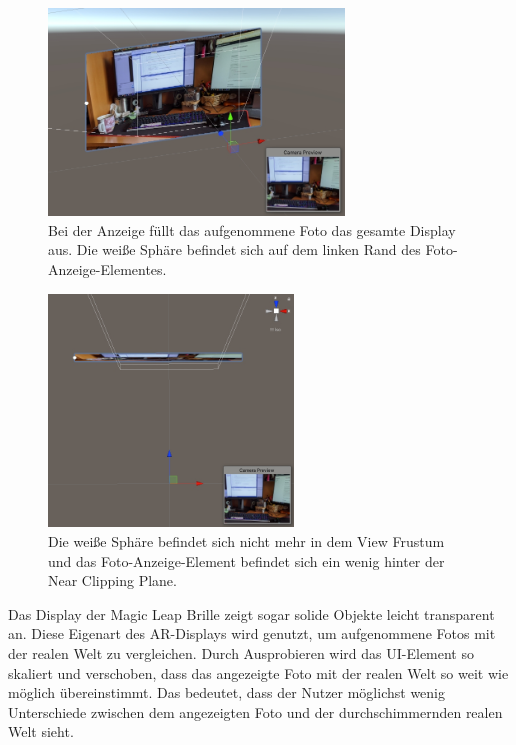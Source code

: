 \begin{figure}[H]
	\centering
	\includegraphics[width=0.7\textwidth]{images/canvasinyourface2.jpg}
	\caption[Ränder des Foto-Anzeige-Elements finden]{Bei der Anzeige füllt das aufgenommene Foto das gesamte Display aus. Die weiße Sphäre befindet sich auf dem linken Rand des Foto-Anzeige-Elementes.}
	\label{illustration:canvasinsourface}
\end{figure}

\begin{figure}[H]
	\centering
	\includegraphics[width=0.58\textwidth]{images/canvasinyourfaceTopDown2.jpg}
	\caption[Tiefe des Foto-Anzeige-Elements finden]{Die weiße Sphäre befindet sich nicht mehr in dem View Frustum und das Foto-Anzeige-Element befindet sich ein wenig hinter der Near Clipping Plane.}
	\label{illustration:canvasinsourfacetodown}
\end{figure}

Das Display der Magic Leap Brille zeigt sogar solide Objekte leicht transparent an. Diese Eigenart des AR-Displays wird genutzt, um aufgenommene Fotos mit der realen Welt zu vergleichen. Durch Ausprobieren wird das UI-Element so skaliert und verschoben, dass das angezeigte Foto mit der realen Welt so weit wie möglich übereinstimmt. Das bedeutet, dass der Nutzer möglichst wenig Unterschiede zwischen dem angezeigten Foto und der durchschimmernden realen Welt sieht.

